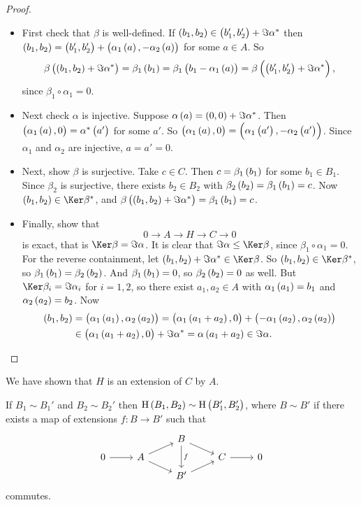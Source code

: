 \begin{proof}
\hfill
\begin{itemize}
\item First check that $ \beta $ is well-defined. If $ \br{b_1, b_2} \in \br{b_1', b_2'} + \Im \alpha^* $ then $ \br{b_1, b_2} = \br{b_1', b_2'} + \br{\alpha_1\br{a}, -\alpha_2\br{a}} $ for some $ a \in A $. So
$$ \beta\br{\br{b_1, b_2} + \Im \alpha^*} = \beta_1\br{b_1} = \beta_1\br{b_1 - \alpha_1\br{a}} = \beta\br{\br{b_1', b_2'} + \Im \alpha^*}, $$
since $ \beta_1 \circ \alpha_1 = 0 $.
\item Next check $ \alpha $ is injective. Suppose $ \alpha\br{a} = \br{0, 0} + \Im \alpha^* $. Then $ \br{\alpha_1\br{a}, 0} = \alpha^*\br{a'} $ for some $ a' $. So $ \br{\alpha_1\br{a}, 0} = \br{\alpha_1\br{a'}, -\alpha_2\br{a'}} $. Since $ \alpha_1 $ and $ \alpha_2 $ are injective, $ a = a' = 0 $.
\item Next, show $ \beta $ is surjective. Take $ c \in C $. Then $ c = \beta_1\br{b_1} $ for some $ b_1 \in B_1 $. Since $ \beta_2 $ is surjective, there exists $ b_2 \in B_2 $ with $ \beta_2\br{b_2} = \beta_1\br{b_1} = c $. Now $ \br{b_1, b_2} \in \Ker \beta^* $, and $ \beta\br{\br{b_1, b_2} + \Im \alpha^*} = \beta_1\br{b_1} = c $.
\item Finally, show that
$$ 0 \to A \to H \to C \to 0 $$
is exact, that is $ \Ker \beta = \Im \alpha $. It is clear that $ \Im \alpha \le \Ker \beta $, since $ \beta_1 \circ \alpha_1 = 0 $. For the reverse containment, let $ \br{b_1, b_2} + \Im \alpha^* \in \Ker \beta $. So $ \br{b_1, b_2} \in \Ker \beta^* $, so $ \beta_1\br{b_1} = \beta_2\br{b_2} $. And $ \beta_1\br{b_1} = 0 $, so $ \beta_2\br{b_2} = 0 $ as well. But $ \Ker \beta_i = \Im \alpha_i $ for $ i = 1, 2 $, so there exist $ a_1, a_2 \in A $ with $ \alpha_1\br{a_1} = b_1 $ and $ \alpha_2\br{a_2} = b_2 $. Now
\begin{align*}
\br{b_1, b_2}
& = \br{\alpha_1\br{a_1}, \alpha_2\br{a_2}}
= \br{\alpha_1\br{a_1 + a_2}, 0} + \br{-\alpha_1\br{a_2}, \alpha_2\br{a_2}} \\
& \in \br{\alpha_1\br{a_1 + a_2}, 0} + \Im \alpha^*
= \alpha\br{a_1 + a_2}
\in \Im \alpha.
\end{align*}
\end{itemize}
\end{proof}

We have shown that $ H $ is an extension of $ C $ by $ A $.

\pagebreak

\begin{proposition}
If $ B_1 \sim B_1' $ and $ B_2 \sim B_2' $ then $ \H\br{B_1, B_2} \sim \H\br{B_1', B_2'} $, where $ B \sim B' $ if there exists a map of extensions $ f : B \to B' $ such that
$$
\begin{tikzcd}[row sep=tiny]
& & B \arrow{dr} \arrow{dd}{f} & & \\
0 \arrow{r} & A \arrow{ur} \arrow[swap]{dr} & & C \arrow{r} & 0 \\
& & B' \arrow[swap]{ur} & &
\end{tikzcd}
$$
commutes.
\end{proposition}

